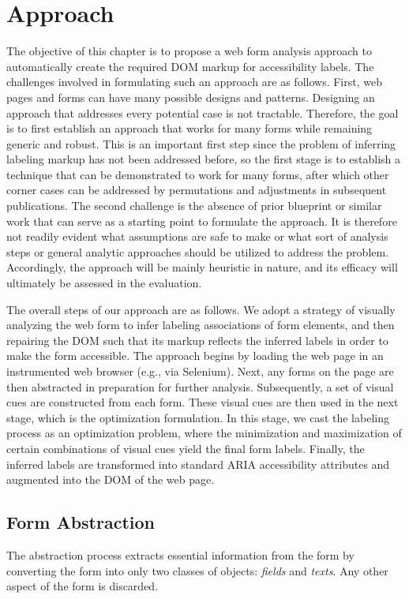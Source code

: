 \section{Approach}

The objective of this chapter is to propose a web form analysis approach 
to automatically create the required DOM markup for accessibility labels. 
The challenges involved in formulating such an approach are as follows. 
First, web pages and forms can have many possible designs and patterns. 
Designing an approach that addresses every potential case is not tractable. 
Therefore, the goal is to first establish an approach that works for many forms while 
remaining generic and robust. This is an important first step since the problem 
of inferring labeling markup has not been addressed before, so the first stage is 
to establish a technique that can be demonstrated to work for many forms, 
after which other corner cases can be addressed by permutations and adjustments 
in subsequent publications. The second challenge is the absence of prior blueprint 
or similar work that can serve as a starting point to formulate the approach. 
It is therefore not readily evident what assumptions are safe to make or what 
sort of analysis steps or general analytic approaches should be utilized to 
address the problem. Accordingly, the approach will be mainly heuristic in 
nature, and its efficacy will ultimately be assessed in the evaluation.  

The overall steps of our approach are as follows. We adopt a strategy of visually 
analyzing the web form to infer labeling associations of form elements, 
and then repairing the DOM such that its markup reflects 
the inferred labels in order to make the form accessible.
The approach begins by loading the web page in an instrumented web browser 
(e.g., via Selenium). 
Next, any forms on the page are then abstracted in preparation for further 
analysis. 
Subsequently, a set of visual cues are constructed from each form. 
These visual cues are then used in the next stage, which is the optimization 
formulation. In this stage, we cast the labeling process as an optimization 
problem, where the minimization and maximization of certain combinations 
of visual cues yield the final form labels. 
Finally, the inferred labels are transformed into standard ARIA accessibility 
attributes and augmented into the DOM of the web page. 

\subsection{Form Abstraction} \label{sec:approach-abs}
The abstraction process extracts essential information from the form by converting 
the form into only two classes of objects: \emph{fields} and \emph{texts}. 
Any other aspect of the form is discarded. 

